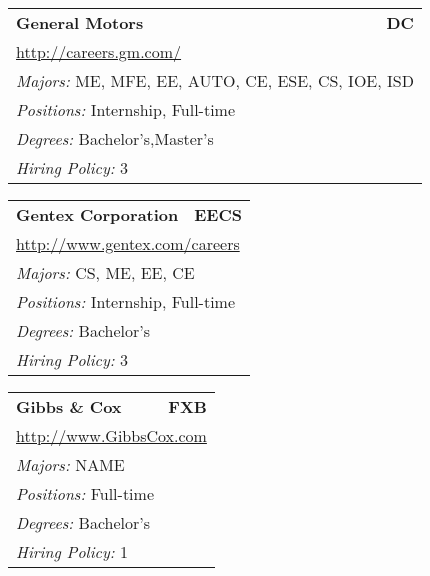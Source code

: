\documentclass[twoside]{article}
\begin{document}
\begin{center}
\begin{multicols}{3}
\begin{FlushLeft}
\begin{minipage}{.9\columnwidth}
\end{minipage}
 
\begin{minipage}{.9\columnwidth}\begin{tabularx}{.95\columnwidth}{Xr}
                 {\Large\bf General Motors} & {\Large\bf DC}\\
    \multicolumn{2}{p{.95\columnwidth}}{\url{http://careers.gm.com/}}\\
    \multicolumn{2}{p{.95\columnwidth}}{\emph{Majors:} ME, MFE, EE, AUTO, CE, ESE, CS, IOE, ISD}\\
    \multicolumn{2}{p{.95\columnwidth}}{\emph{Positions:} Internship, Full-time}\\
    \multicolumn{2}{p{.95\columnwidth}}{\emph{Degrees:} Bachelor's,Master's}\\
    \multicolumn{2}{p{.95\columnwidth}}{\emph{Hiring Policy:} 3}\\
    \end{tabularx}
    
\end{minipage}
 
\begin{minipage}{.9\columnwidth}\begin{tabularx}{.95\columnwidth}{Xr}
                 {\Large\bf Gentex Corporation} & {\Large\bf EECS}\\
    \multicolumn{2}{p{.95\columnwidth}}{\url{http://www.gentex.com/careers}}\\
    \multicolumn{2}{p{.95\columnwidth}}{\emph{Majors:} CS, ME, EE, CE}\\
    \multicolumn{2}{p{.95\columnwidth}}{\emph{Positions:} Internship, Full-time}\\
    \multicolumn{2}{p{.95\columnwidth}}{\emph{Degrees:} Bachelor's}\\
    \multicolumn{2}{p{.95\columnwidth}}{\emph{Hiring Policy:} 3}\\
    \end{tabularx}
    
\end{minipage}
 
\begin{minipage}{.9\columnwidth}\begin{tabularx}{.95\columnwidth}{Xr}
                 {\Large\bf Gibbs \& Cox} & {\Large\bf FXB}\\
    \multicolumn{2}{p{.95\columnwidth}}{\url{http://www.GibbsCox.com}}\\
    \multicolumn{2}{p{.95\columnwidth}}{\emph{Majors:} NAME}\\
    \multicolumn{2}{p{.95\columnwidth}}{\emph{Positions:} Full-time}\\
    \multicolumn{2}{p{.95\columnwidth}}{\emph{Degrees:} Bachelor's}\\
    \multicolumn{2}{p{.95\columnwidth}}{\emph{Hiring Policy:} 1}\\
    \end{tabularx}
    

\end{minipage}
\end{FlushLeft}
\end{multicols}
\end{center}
\end{document}
